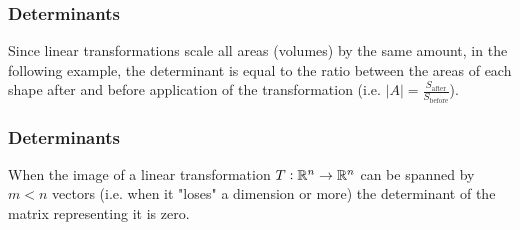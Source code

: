 \begin{frame}
  \frametitle{Determinants}
  \begin{presentation_example}
    Since linear transformations scale all areas (volumes) by the same amount, in the following example, the determinant is equal to the ratio between the areas of each shape after and before application of the transformation (i.e. $|A|=\frac{S_{\text{after}}}{S_{\text{before}}}$).
    \begin{figure}[H]
      \centering
    \end{figure}
  \end{presentation_example}
\end{frame}

\begin{frame}
  \frametitle{Determinants}
  When the image of a linear transformation $T:\mathbb{R}^{n}\rightarrow\mathbb{R}^{n}$ can be spanned by $m < n$ vectors (i.e. when it "loses" a dimension or more) the determinant of the matrix representing it is zero.
\end{frame}


